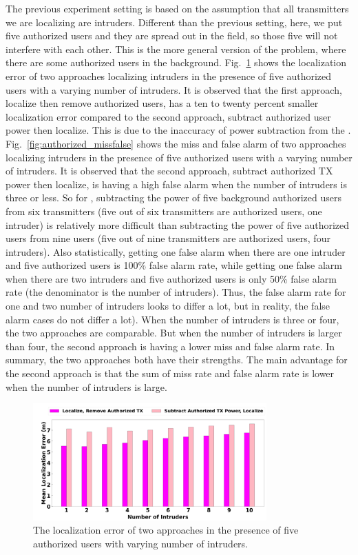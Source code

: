 The previous experiment setting is based on the assumption that all transmitters we are localizing are intruders.
Different than the previous setting, here, we put five authorized users and they are spread out in the field, so those five will not interfere with each other.
This is the more general version of the \mtl problem, where there are some authorized users in the background.
Fig.~\ref{fig:authorized_error} shows the localization error of two approaches localizing intruders in the presence of five authorized users with a varying number of intruders.
It is observed that the first approach, localize then remove authorized users, has a ten to twenty percent smaller localization error compared to the second approach, subtract authorized user power then localize.
This is due to the inaccuracy of power subtraction from the \subtract.
Fig.~\ref{fig:authorized_missfalse} shows the miss and false alarm of two approaches localizing intruders in the presence of five authorized users with a varying number of intruders.
It is observed that the second approach, subtract authorized TX power then localize, is having a high false alarm when the number of intruders is three or less.
So for \subtract, subtracting the power of five background authorized users from six transmitters (five out of six transmitters are authorized users, one intruder) is relatively more difficult than subtracting the power of five authorized users from nine users (five out of nine transmitters are authorized users, four intruders). 
Also statistically, getting one false alarm when there are one intruder and five authorized users is 100\% false alarm rate, while getting one false alarm when there are two intruders and five authorized users is only 50\% false alarm rate (the denominator is the number of intruders).
Thus, the false alarm rate for one and two number of intruders looks to differ a lot, but in reality, the false alarm cases do not differ a lot).
When the number of intruders is three or four, the two approaches are comparable. But when the number of intruders is larger than four, the second approach is having a lower miss and false alarm rate.
In summary, the two approaches both have their strengths.
The main advantage for the second approach is that the sum of miss rate and false alarm rate is lower when the number of intruders is large.

\begin{figure}[t]
    \centering
    \includegraphics[width=0.8\textwidth]{chapters/wowmom-pmc/figures/splat-error-authorized-varyintru.png}
    \caption{The localization error of two approaches in the presence of five authorized users with varying number of intruders.}
    \label{fig:authorized_error}
\end{figure}

